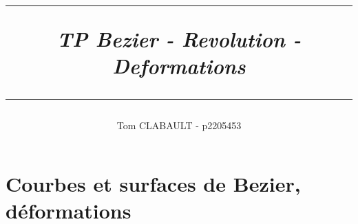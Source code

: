 \documentclass[11pt]{article}
\author{Tom CLABAULT - p2205453\\}
\title{
\noindent\rule{\textwidth}{1pt}
\textit{\textbf{TP Bezier - Revolution - Deformations}}\\
\noindent\rule{\textwidth}{1pt}
}
\begin{document}
\maketitle

\section{Courbes et surfaces de Bezier, déformations}
        	
\end{document}
